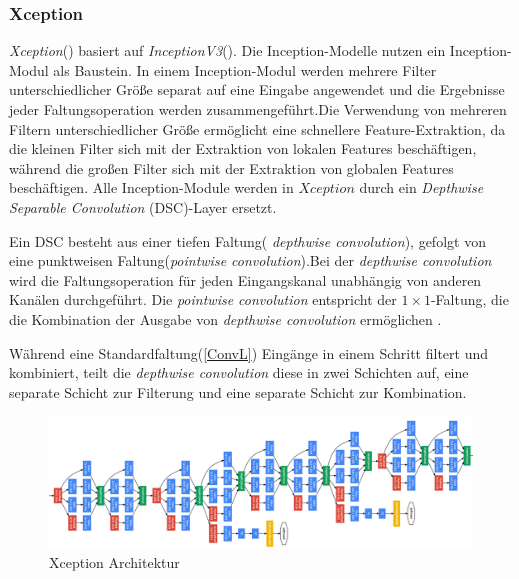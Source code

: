 \documentclass[12pt,a4paper]{scrartcl}
\numberwithin{equation}{section}
\begin{document}
\subsubsection{Xception}\label{Xception}
\textit{Xception}(\cite{Xception}) basiert auf  \textit{InceptionV3}(\cite{InceptionV3}). 
Die Inception-Modelle nutzen ein Inception-Modul als Baustein. In einem Inception-Modul werden mehrere Filter unterschiedlicher Größe separat auf eine Eingabe angewendet und die Ergebnisse jeder Faltungsoperation werden zusammengeführt.Die Verwendung von mehreren Filtern unterschiedlicher Größe ermöglicht eine schnellere Feature-Extraktion, da die kleinen Filter sich mit der Extraktion von lokalen Features beschäftigen, während die großen Filter sich mit der Extraktion von globalen Features beschäftigen.
Alle Inception-Module werden in $ Xception $ durch ein \textit{Depthwise Separable Convolution }(DSC)-Layer ersetzt. 

Ein DSC besteht aus einer tiefen Faltung( \textit{depthwise convolution}), gefolgt von eine punktweisen Faltung(\textit{pointwise convolution}).Bei der \textit{depthwise convolution} wird die Faltungsoperation für jeden Eingangskanal unabhängig von anderen Kanälen durchgeführt. Die \textit{pointwise convolution} entspricht der $ 1\times 1 $-Faltung, die die Kombination der Ausgabe von \textit{depthwise convolution} ermöglichen .

Während eine Standardfaltung(\ref{ConvL})  Eingänge in einem Schritt filtert und kombiniert, teilt die \textit{depthwise convolution} diese in zwei Schichten auf, eine separate Schicht zur Filterung und eine separate Schicht zur Kombination.




\begin{figure}[h]
	\centering
	\includegraphics[width=\textwidth ]{Xception}
	\caption{ Xception Architektur}
	\label{fig:Xception}
\end{figure}
\end{document}

